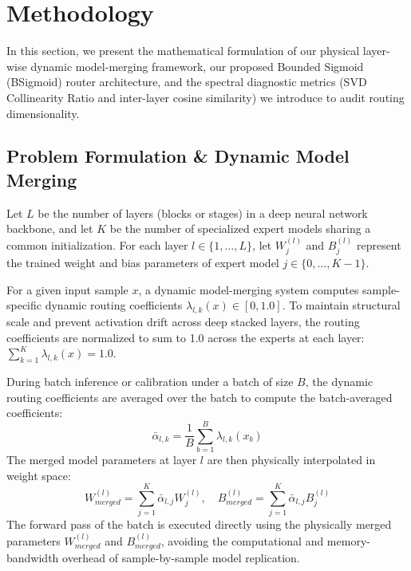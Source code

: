\section{Methodology}
\label{sec:methodology}

In this section, we present the mathematical formulation of our physical layer-wise dynamic model-merging framework, our proposed Bounded Sigmoid (BSigmoid) router architecture, and the spectral diagnostic metrics (SVD Collinearity Ratio and inter-layer cosine similarity) we introduce to audit routing dimensionality.

\subsection{Problem Formulation \& Dynamic Model Merging}

Let $L$ be the number of layers (blocks or stages) in a deep neural network backbone, and let $K$ be the number of specialized expert models sharing a common initialization. For each layer $l \in \{1, \dots, L\}$, let $W_j^{(l)}$ and $B_j^{(l)}$ represent the trained weight and bias parameters of expert model $j \in \{0, \dots, K-1\}$.

For a given input sample $x$, a dynamic model-merging system computes sample-specific dynamic routing coefficients $\lambda_{l, k}(x) \in [0, 1.0]$. To maintain structural scale and prevent activation drift across deep stacked layers, the routing coefficients are normalized to sum to 1.0 across the experts at each layer: $\sum_{k=1}^K \lambda_{l, k}(x) = 1.0$.

During batch inference or calibration under a batch of size $B$, the dynamic routing coefficients are averaged over the batch to compute the batch-averaged coefficients:
\begin{equation}
\bar{\alpha}_{l, k} = \frac{1}{B} \sum_{b=1}^B \lambda_{l, k}(x_b)
\end{equation}
The merged model parameters at layer $l$ are then physically interpolated in weight space:
\begin{equation}
\label{eq:physical_merge}
W_{merged}^{(l)} = \sum_{j=1}^K \bar{\alpha}_{l, j} W_j^{(l)}, \quad B_{merged}^{(l)} = \sum_{j=1}^K \bar{\alpha}_{l, j} B_j^{(l)}
\end{equation}
The forward pass of the batch is executed directly using the physically merged parameters $W_{merged}^{(l)}$ and $B_{merged}^{(l)}$, avoiding the computational and memory-bandwidth overhead of sample-by-sample model replication.

